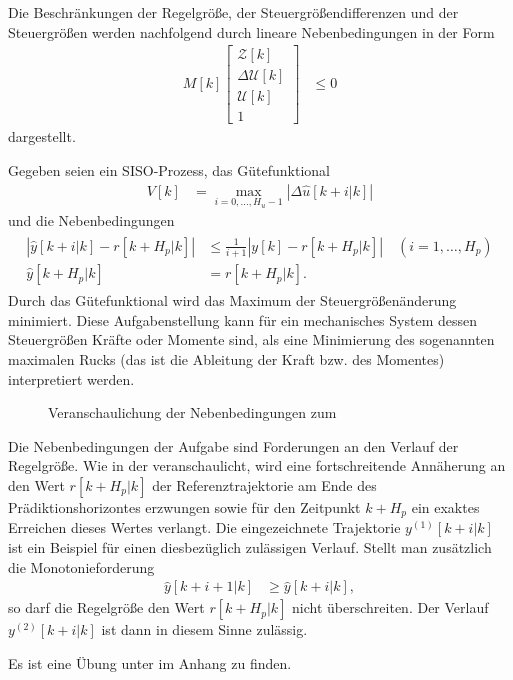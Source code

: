 Die Beschränkungen der Regelgröße, der Steuergrößendifferenzen und der Steuergrößen werden nachfolgend durch lineare Nebenbedingungen in der Form
\begin{align}
M[k]\begin{bmatrix}
\mathcal{Z}[k]\\ \Delta\mathcal{U}[k]\\ \mathcal{U}[k]\\ 1
\end{bmatrix} & \le 0	\label{eqn:kap_4_lin_nebenbedingungen}
\end{align}
dargestellt.
\begin{exmp}
Gegeben seien ein \ac{SISO}-Prozess, das Gütefunktional
\begin{align*}
	V[k] & = \max\limits_{i=0,\ldots,H_u-1}\left|\Delta\hat{u}[k+i|k] \right|
\end{align*}
und die Nebenbedingungen
\begin{align}
\begin{split}\label{eqn:kap_4_bsp_1_nebenbedingungen}
	\left|\hat{y}[k+i|k]-r[k+H_p|k] \right| & \le \frac{1}{i+1}\left| y[k] - r[k+H_p|k] \right|\quad (i=1,\ldots,H_p)\\
	\hat{y}[k+H_p|k] & = r[k+H_p|k].
\end{split}
\end{align}
Durch das Gütefunktional wird das Maximum der Steuergrößenänderung minimiert. Diese Aufgabenstellung kann für ein mechanisches System dessen Steuergrößen Kräfte oder Momente sind, als
eine Minimierung des sogenannten maximalen Rucks (das ist die Ableitung der Kraft bzw. des Momentes) interpretiert werden.
\begin{figure}[htb]
	\centering
	
	\caption{Veranschaulichung der Nebenbedingungen zum }
	\label{fig:kap_4_bsp_nebenbedingungen}
\end{figure}
Die Nebenbedingungen der Aufgabe sind Forderungen an den Verlauf der Regelgröße. Wie in der  veranschaulicht, wird eine fortschreitende Annäherung
an den Wert $r[k+H_p|k]$ der Referenztrajektorie am Ende des Prädiktionshorizontes erzwungen sowie für den Zeitpunkt $k+H_p$ ein exaktes Erreichen dieses Wertes verlangt. Die
eingezeichnete Trajektorie $y^{(1)}[k+i|k]$ ist ein Beispiel für einen diesbezüglich zulässigen Verlauf. Stellt man zusätzlich die Monotonieforderung
\begin{align}
	\hat{y}[k+i+1|k] & \ge \hat{y}[k+i|k], \label{eqn:kap_4_monotonie_anf}
\end{align}
so darf die Regelgröße den Wert $r[k+H_p|k]$ nicht überschreiten. Der Verlauf $y^{(2)}[k+i|k]$ ist dann in diesem Sinne zulässig.
\end{exmp}
Es ist eine Übung unter  im Anhang zu finden.

